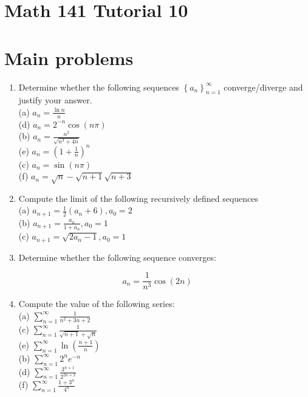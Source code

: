 \documentclass[10pt]{article}
\begin{document}
\section*{Math 141 Tutorial 10}
\section*{Main problems}
\begin{enumerate}
  \item Determine whether the following sequences $\left\{a_{n}\right\}_{n=1}^{\infty}$ converge/diverge and justify your answer.\\
(a) $a_{n}=\frac{\ln n}{n}$\\
(d) $a_{n}=2^{-n} \cos (n \pi)$\\
(b) $a_{n}=\frac{n^{2}}{\sqrt{n^{3}+4 n}}$\\
(e) $a_{n}=\left(1+\frac{1}{n}\right)^{n}$\\
(c) $a_{n}=\sin (n \pi)$\\
(f) $a_{n}=\sqrt{n}-\sqrt{n+1} \sqrt{n+3}$
  \item Compute the limit of the following recursively defined sequences\\
(a) $a_{n+1}=\frac{1}{2}\left(a_{n}+6\right), a_{0}=2$\\
(b) $a_{n+1}=\frac{a_{n}}{1+a_{n}}, a_{0}=1$\\
(c) $a_{n+1}=\sqrt{2 a_{n}-1}, a_{0}=1$
  \item Determine whether the following sequence converges:
\end{enumerate}

$$
a_{n}=\frac{1}{n^{3}} \cos (2 n)
$$

\begin{enumerate}
  \setcounter{enumi}{3}
  \item Compute the value of the following series:\\
(a) $\sum_{n=1}^{\infty} \frac{1}{n^{2}+3 n+2}$\\
(c) $\sum_{n=1}^{\infty} \frac{1}{\sqrt{n+1}+\sqrt{n}}$\\
(e) $\sum_{n=1}^{\infty} \ln \left(\frac{n+1}{n}\right)$\\
(b) $\sum_{n=1}^{\infty} 2^{n} e^{-n}$\\
(d) $\sum_{n=1}^{\infty} \frac{3^{n+1}}{2^{2 n+2}}$\\
(f) $\sum_{n=1}^{\infty} \frac{1+3^{n}}{4^{n}}$
\end{enumerate}
\end{document}
